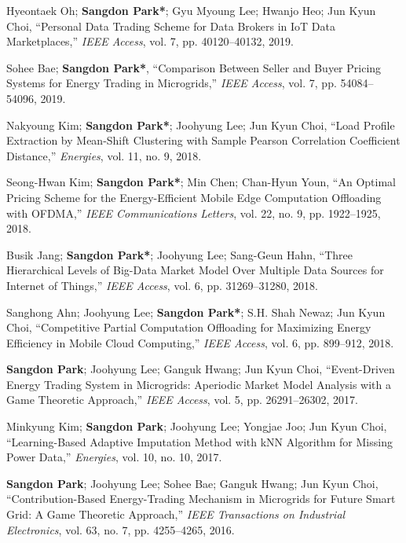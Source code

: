 \documentclass[11pt,a4paper]{article}
\begin{document}
\begin{enumerate}[label={[{\arabic*}]}, leftmargin=*, itemsep=0.3em]
\item Hyeontaek Oh; \textbf{Sangdon Park*}; Gyu Myoung Lee; Hwanjo Heo; Jun Kyun Choi, ``Personal Data Trading Scheme for Data Brokers in IoT Data Marketplaces,'' \textit{IEEE Access}, vol. 7, pp. 40120--40132, 2019.

\item Sohee Bae; \textbf{Sangdon Park*}, ``Comparison Between Seller and Buyer Pricing Systems for Energy Trading in Microgrids,'' \textit{IEEE Access}, vol. 7, pp. 54084--54096, 2019.

\item Nakyoung Kim; \textbf{Sangdon Park*}; Joohyung Lee; Jun Kyun Choi, ``Load Profile Extraction by Mean-Shift Clustering with Sample Pearson Correlation Coefficient Distance,'' \textit{Energies}, vol. 11, no. 9, 2018.

\item Seong-Hwan Kim; \textbf{Sangdon Park*}; Min Chen; Chan-Hyun Youn, ``An Optimal Pricing Scheme for the Energy-Efficient Mobile Edge Computation Offloading with OFDMA,'' \textit{IEEE Communications Letters}, vol. 22, no. 9, pp. 1922--1925, 2018.

\item Busik Jang; \textbf{Sangdon Park*}; Joohyung Lee; Sang-Geun Hahn, ``Three Hierarchical Levels of Big-Data Market Model Over Multiple Data Sources for Internet of Things,'' \textit{IEEE Access}, vol. 6, pp. 31269--31280, 2018.

\item Sanghong Ahn; Joohyung Lee; \textbf{Sangdon Park*}; S.H. Shah Newaz; Jun Kyun Choi, ``Competitive Partial Computation Offloading for Maximizing Energy Efficiency in Mobile Cloud Computing,'' \textit{IEEE Access}, vol. 6, pp. 899--912, 2018.

\item \textbf{Sangdon Park}; Joohyung Lee; Ganguk Hwang; Jun Kyun Choi, ``Event-Driven Energy Trading System in Microgrids: Aperiodic Market Model Analysis with a Game Theoretic Approach,'' \textit{IEEE Access}, vol. 5, pp. 26291--26302, 2017.

\item Minkyung Kim; \textbf{Sangdon Park}; Joohyung Lee; Yongjae Joo; Jun Kyun Choi, ``Learning-Based Adaptive Imputation Method with kNN Algorithm for Missing Power Data,'' \textit{Energies}, vol. 10, no. 10, 2017.

\item \textbf{Sangdon Park}; Joohyung Lee; Sohee Bae; Ganguk Hwang; Jun Kyun Choi, ``Contribution-Based Energy-Trading Mechanism in Microgrids for Future Smart Grid: A Game Theoretic Approach,'' \textit{IEEE Transactions on Industrial Electronics}, vol. 63, no. 7, pp. 4255--4265, 2016.
\end{enumerate}
\end{document}
